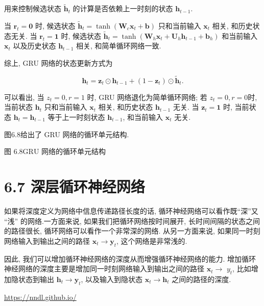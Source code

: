 \documentclass[10pt]{article}
\begin{document}
用来控制候选状态 $\tilde{\boldsymbol{h}}_{t}$ 的计算是否依赖上一时刻的状态 $\boldsymbol{h}_{t-1}$.

当 $\boldsymbol{r}_{t}=\mathbf{0}$ 时, 候选状态 $\tilde{\boldsymbol{h}}_{t}=\tanh \left(\boldsymbol{W}_{c} \boldsymbol{x}_{t}+\boldsymbol{b}\right)$ 只和当前输入 $\boldsymbol{x}_{t}$ 相关, 和历史状态无关. 当 $\boldsymbol{r}_{t}=\mathbf{1}$ 时, 候选状态 $\tilde{\boldsymbol{h}}_{t}=\tanh \left(\boldsymbol{W}_{h} \boldsymbol{x}_{t}+\boldsymbol{U}_{h} \boldsymbol{h}_{t-1}+\boldsymbol{b}_{h}\right)$ 和当前输入 $\boldsymbol{x}_{t}$ 以及历史状态 $\boldsymbol{h}_{t-1}$ 相关, 和简单循环网络一致.

综上, GRU 网络的状态更新方式为


\begin{equation*}
\boldsymbol{h}_{t}=\boldsymbol{z}_{t} \odot \boldsymbol{h}_{t-1}+\left(1-\boldsymbol{z}_{t}\right) \odot \tilde{\boldsymbol{h}}_{t} . \tag{6.69}
\end{equation*}


可以看出, 当 $z_{t}=0, r=1$ 时, GRU 网络退化为简单循环网络; 若 $z_{t}=0, r=0$时, 当前状态 $\boldsymbol{h}_{t}$ 只和当前输入 $\boldsymbol{x}_{t}$ 相关, 和历史状态 $\boldsymbol{h}_{t-1}$ 无关. 当 $\boldsymbol{z}_{t}=\mathbf{1}$ 时, 当前状态 $\boldsymbol{h}_{t}=\boldsymbol{h}_{t-1}$ 等于上一时刻状态 $\boldsymbol{h}_{t-1}$, 和当前输入 $\boldsymbol{x}_{t}$ 无关.

图6.8给出了 GRU 网络的循环单元结构.



图 $6.8 \mathrm{GRU}$ 网络的循环单元结构

\section*{6.7 深层循环神经网络}
如果将深度定义为网络中信息传递路径长度的话, 循环神经网络可以看作既“深”又 “浅” 的网络.一方面来说, 如果我们把循环网络按时间展开, 长时间间隔的状态之间的路径很长, 循环网络可以看作一个非常深的网络. 从另一方面来说, 如果同一时刻网络输入到输出之间的路径 $\boldsymbol{x}_{t} \rightarrow \boldsymbol{y}_{t}$, 这个网络是非常浅的.

因此, 我们可以增加循环神经网络的深度从而增强循环神经网络的能力. 增加循环神经网络的深度主要是增加同一时刻网络输入到输出之间的路径 $\boldsymbol{x}_{t} \rightarrow$ $y_{t}$, 比如增加隐状态到输出 $\boldsymbol{h}_{t} \rightarrow \boldsymbol{y}_{t}$, 以及输入到隐状态 $\boldsymbol{x}_{t} \rightarrow \boldsymbol{h}_{t}$ 之间的路径的深度.

\href{https://nndl.github.io/}{https://nndl.github.io/}
\end{document}
